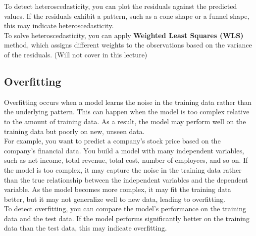\documentclass[11pt]{article}
\begin{document}
To detect heteroscedasticity, you can plot the residuals against the predicted values. If the residuals exhibit a pattern, such as a cone shape or a funnel shape, this may indicate heteroscedasticity. \\
To solve heteroscedasticity, you can apply \textbf{Weighted Least Squares (WLS)} method, which assigns different weights to the observations based on the variance of the residuals. (Will not cover in this lecture)

\subsection{Overfitting}

Overfitting occurs when a model learns the noise in the training data rather than the underlying pattern. This can happen when the model is too complex relative to the amount of training data. As a result, the model may perform well on the training data but poorly on new, unseen data. \\
For example, you want to predict a company's stock price based on the company's financial data. You build a model with many independent variables, such as net income, total revenue, total cost, number of employees, and so on. If the model is too complex, it may capture the noise in the training data rather than the true relationship between the independent variables and the dependent variable. 
As the model becomes more complex, it may fit the training data better, but it may not generalize well to new data, leading to overfitting. \\
To detect overfitting, you can compare the model's performance on the training data and the test data. If the model performs significantly better on the training data than the test data, this may indicate overfitting. \\
\end{document}

